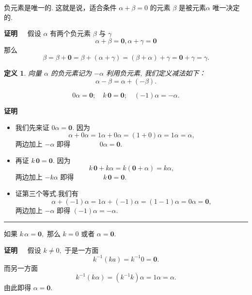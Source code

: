 \documentclass[13pt]{beamer}
\newtheorem*{defi}{定义}
\def\qed{\nopagebreak\hfill{\rule{4pt}{7pt}}\medbreak}
\def\pf{{\bf 证明~~ }}
\def\0{\mathbf{0}}
\def\a{\alpha}
\begin{document}
\begin{frame}
\begin{proposition}
负元素是唯一的. 这就是说，适合条件 ${\alpha}+{\beta}={0}$ 的元素 ${\beta}$ 是被元素${\alpha}$ 唯一决定
的. 
\end{proposition}
\pf   假设 ${\alpha}$ 有两个负元素 ${\beta}$ 与 $\gamma$
\[
{\alpha}+{\beta}={\0}, {\alpha}+{\gamma}={\0}
\]
那么
\[
{\beta}={\beta}+{\0}={\beta}+({\alpha}+{\gamma})=({\beta}+{\alpha})+{\gamma}={\0}+{\gamma}={\gamma}.
\]
\begin{defi}
	向量 ${\alpha}$ 的负元素记为 $-{\alpha}$
利用负元素, 我们定义减法如下：
\[
{\alpha}-{\beta}={\alpha}+(-{\beta}).
\]
\end{defi}


\end{frame}


\begin{frame}
\begin{proposition}
\[ 
0 {\alpha}={\0}; \quad {k}\, {\0}={\0}; \quad (-1) {\alpha}=-{\alpha}.
\]
\end{proposition}
\pf 
\small{
\begin{itemize}
\item 我们先来证 $0 {\alpha}={\0}$. 因为
\[
\alpha+0 \alpha=1 \alpha+0 \alpha=(1+0) \alpha=1 \alpha=\alpha,
\]
两边加上 $- \a$ 即得
$\qquad \qquad 
0 \alpha=\0.
$

\item 再证 ${k}\, {\0}={\0}$. 因为
\[
{k}\, {\0} + k \alpha=k \left( \0 + \alpha\right)
=k \alpha,
\]
两边加上 $-k \a$ 即得
$\qquad \qquad 
{k}\, {\0}={\0}.
$

\item 证第三个等式.我们有
\[
{\a}+(-1) {\a}=1 {\a}+(-1) {\a}=(1-1) {\a}=0 {\alpha}={\0},
\]
两边加上 $-\alpha$ 即得\qquad
$
(-1) {\alpha}=-{\alpha}.
$
\end{itemize}
}\qed
\end{frame}


\begin{frame}
\begin{proposition}
如果  $k\, \alpha={\0},$ 那么 $k=0$ 或者 ${\alpha}={\0}$.
\end{proposition}
\pf  
假设 $k \neq 0,$ 于是一方面
\[
k^{-1} (k a)=k^{-1} {0}=\0.
\]
而另一方面
\[
k^{-1}(k \alpha)=\left(k^{-1} k\right) \alpha=1 \alpha=\alpha.
\]
由此即得 \quad ${\alpha}={\0}.$
\end{frame}
\end{document}
